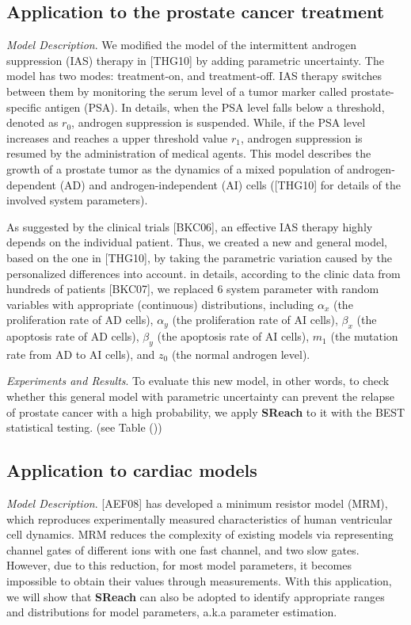 \documentclass[runningheads,a4paper]{llncs}
\begin{document}
\subsection{Application to the prostate cancer treatment}

\textit{Model Description}.
We modified the model of the intermittent androgen suppression (IAS) therapy in [THG10] by adding parametric uncertainty. The model has two modes: treatment-on, and treatment-off. IAS therapy switches between them by monitoring the serum level of a tumor marker called prostate-specific antigen (PSA). In details, when the PSA level falls below a threshold, denoted as $r_0$, androgen suppression is suspended. While, if the PSA level increases and reaches a upper threshold value $r_1$, androgen suppression is resumed by the administration of medical agents. This model describes the growth of a prostate tumor as the dynamics of a mixed population of androgen-dependent (AD) and androgen-independent (AI) cells ([THG10] for details of the involved system parameters). 

As suggested by the clinical trials [BKC06], an effective IAS therapy highly depends on the individual patient. Thus, we created a new and general model, based on the one in [THG10], by taking the parametric variation caused by the personalized differences into account. in details, according to the clinic data from hundreds of patients [BKC07], we replaced 6 system parameter with random variables with appropriate (continuous) distributions, including $\alpha_x$ (the proliferation rate of AD cells), $\alpha_y$ (the proliferation rate of AI cells), $\beta_x$ (the apoptosis rate of AD cells), $\beta_y$ (the apoptosis rate of AI cells), $m_1$ (the mutation rate from AD to AI cells), and $z_0$ (the normal androgen level).

\textit{Experiments and Results}. To evaluate this new model, in other words, to check whether this general model with parametric uncertainty can prevent the relapse of prostate cancer with a high probability, we apply {\bf SReach} to it with the BEST statistical testing. (see Table ())


\subsection{Application to cardiac models}
\textit{Model Description}.
[AEF08] has developed a minimum resistor model (MRM), which reproduces experimentally measured characteristics of human ventricular cell dynamics. MRM reduces the complexity of existing models via representing channel gates of different ions with one fast channel, and two slow gates. However, due to this reduction, for most model parameters, it becomes impossible to obtain their values through measurements. With this application, we will show that {\bf SReach} can also be adopted to identify appropriate ranges and distributions for model parameters, a.k.a parameter estimation.
\end{document}
